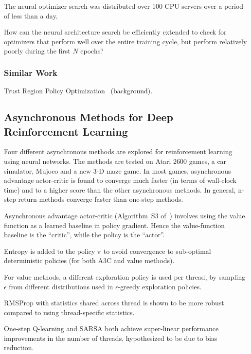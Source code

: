 \documentclass[a4paper, 12pt]{article}
\begin{document}
The neural optimizer search was distributed over \num{100} CPU servers over a
period of less than a day.

How can the neural architecture search be efficiently extended to check for
optimizers that perform well over the entire training cycle, but perform
relatively poorly during the first $N$ epochs?

\subsubsection{Similar Work}

Trust Region Policy Optimization~\citet{DBLP:journals/corr/SchulmanLMJA15}
(background).


\subsection{Asynchronous Methods for Deep Reinforcement
            Learning~\citet{DBLP:journals/corr/MnihBMGLHSK16}}

Four different asynchronous methods are explored for reinforcement learning
using neural networks. The methods are tested on Atari 2600 games, a car
simulator, Mujoco and a new 3-D maze game. In most games, asynchronous
advantage actor-critic is found to converge much faster (in terms of wall-clock
time) and to a higher score than the other asynchronous methods. In general,
n-step return methods converge faster than one-step methods.

Asynchronous advantage actor-critic (Algorithm~S3
of~\citet{DBLP:journals/corr/MnihBMGLHSK16}) involves using the value function
as a learned baseline in policy gradient. Hence the value-function baseline is
the ``critic'', while the policy is the ``actor''.

Entropy is added to the policy $\pi$ \citet{williams1991function} to avoid
convergence to sub-optimal deterministic policies (for both A3C and value
methods).

For value methods, a different exploration policy is used per thread, by
sampling $\epsilon$ from different distributions used in $\epsilon$-greedy
exploration policies.

RMSProp with statistics shared across thread is shown to be more robust
compared to using thread-specific statistics.

One-step Q-learning and SARSA both achieve super-linear performance
improvements in the number of threads, hypothesized to be due to bias
reduction.
\end{document}
